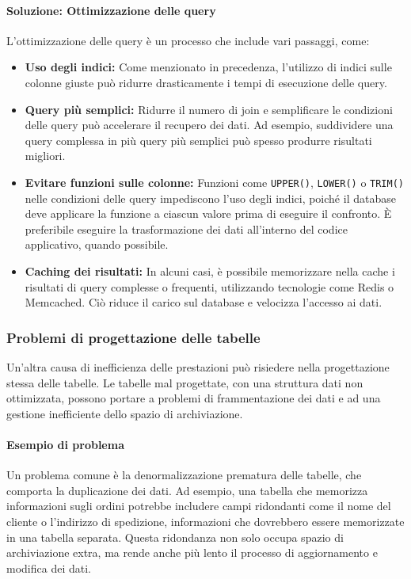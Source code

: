 \paragraph{Soluzione: Ottimizzazione delle query}
L'ottimizzazione delle query è un processo che include vari passaggi, come:
\begin{itemize}
    \item \textbf{Uso degli indici:} Come menzionato in precedenza, l'utilizzo di indici sulle colonne giuste può ridurre drasticamente i tempi di esecuzione delle query.
    \item \textbf{Query più semplici:} Ridurre il numero di join e semplificare le condizioni delle query può accelerare il recupero dei dati. Ad esempio, suddividere una query complessa in più query più semplici può spesso produrre risultati migliori.
    \item \textbf{Evitare funzioni sulle colonne:} Funzioni come \texttt{UPPER()}, \texttt{LOWER()} o \texttt{TRIM()} nelle condizioni delle query impediscono l'uso degli indici, poiché il database deve applicare la funzione a ciascun valore prima di eseguire il confronto. È preferibile eseguire la trasformazione dei dati all'interno del codice applicativo, quando possibile.
    \item \textbf{Caching dei risultati:} In alcuni casi, è possibile memorizzare nella cache i risultati di query complesse o frequenti, utilizzando tecnologie come Redis o Memcached. Ciò riduce il carico sul database e velocizza l'accesso ai dati.
\end{itemize}

\subsubsection{Problemi di progettazione delle tabelle}
Un'altra causa di inefficienza delle prestazioni può risiedere nella progettazione stessa delle tabelle. Le tabelle mal progettate, con una struttura dati non ottimizzata, possono portare a problemi di frammentazione dei dati e ad una gestione inefficiente dello spazio di archiviazione.

\paragraph{Esempio di problema}
Un problema comune è la denormalizzazione prematura delle tabelle, che comporta la duplicazione dei dati. Ad esempio, una tabella che memorizza informazioni sugli ordini potrebbe includere campi ridondanti come il nome del cliente o l'indirizzo di spedizione, informazioni che dovrebbero essere memorizzate in una tabella separata. Questa ridondanza non solo occupa spazio di archiviazione extra, ma rende anche più lento il processo di aggiornamento e modifica dei dati.

